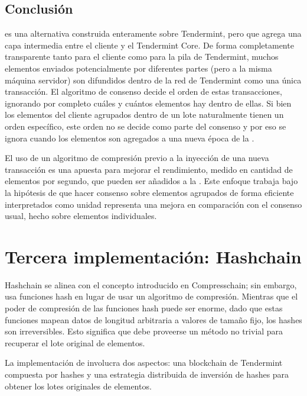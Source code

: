 \subsection{Conclusión}
\compresschain es una alternativa construida enteramente sobre Tendermint, pero que agrega una capa
intermedia entre el cliente y el Tendermint Core.
De forma completamente transparente tanto para el
cliente como para la pila de Tendermint, muchos elementos enviados potencialmente por diferentes partes
(pero a la misma máquina servidor)
son difundidos dentro de la red de Tendermint como una única transacción.
El algoritmo de consenso
decide el orden de estas transacciones, ignorando por completo cuáles y cuántos elementos hay dentro de ellas.
Si bien los elementos del cliente agrupados dentro de un lote naturalmente tienen un orden específico,
este orden no se decide como parte del consenso y por eso se ignora cuando los elementos son agregados
a una nueva época de la \setchain.

%
El uso de un algoritmo de compresión previo a la inyección de una nueva transacción es una apuesta para mejorar
el rendimiento, medido en cantidad de elementos por segundo, que pueden ser añadidos a la \setchain.
Este enfoque trabaja bajo la hipótesis de que hacer consenso sobre elementos agrupados de forma
eficiente interpretados como unidad representa una mejora en comparación con el consenso usual,
hecho sobre elementos individuales.

\section{Tercera implementación: Hashchain}\label{sec:hashchain}
%
Hashchain se alinea con el concepto introducido en Compresschain; sin embargo, usa
funciones hash en lugar de usar un algoritmo de compresión.
%
Mientras que el poder de compresión de las funciones hash puede ser enorme, dado que estas funciones
mapean datos de longitud arbitraria a valores de tamaño fijo, los hashes son irreversibles.
%
Esto significa que debe proveerse un método no trivial para recuperar el lote original de elementos.

La implementación de \hashchain involucra dos aspectos: una blockchain de Tendermint compuesta por hashes
y una estrategia distribuida de inversión de hashes para obtener los lotes originales de elementos.
%

